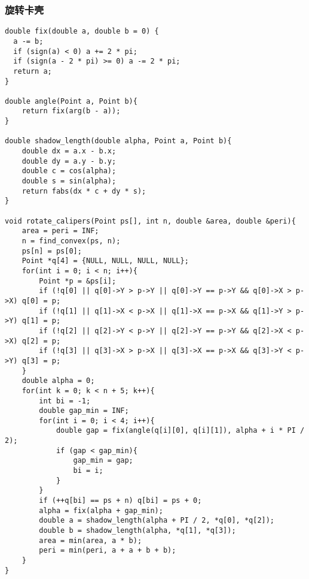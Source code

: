 \subsubsection{旋转卡壳}
\begin{verbatim}
double fix(double a, double b = 0) {
  a -= b;
  if (sign(a) < 0) a += 2 * pi;
  if (sign(a - 2 * pi) >= 0) a -= 2 * pi;
  return a;
}

double angle(Point a, Point b){
    return fix(arg(b - a));
}

double shadow_length(double alpha, Point a, Point b){
    double dx = a.x - b.x;
    double dy = a.y - b.y;
    double c = cos(alpha);
    double s = sin(alpha);
    return fabs(dx * c + dy * s);
}

void rotate_calipers(Point ps[], int n, double &area, double &peri){
    area = peri = INF;
    n = find_convex(ps, n);
    ps[n] = ps[0];
    Point *q[4] = {NULL, NULL, NULL, NULL};
    for(int i = 0; i < n; i++){
        Point *p = &ps[i];
        if (!q[0] || q[0]->Y > p->Y || q[0]->Y == p->Y && q[0]->X > p->X) q[0] = p;
        if (!q[1] || q[1]->X < p->X || q[1]->X == p->X && q[1]->Y > p->Y) q[1] = p;
        if (!q[2] || q[2]->Y < p->Y || q[2]->Y == p->Y && q[2]->X < p->X) q[2] = p;
        if (!q[3] || q[3]->X > p->X || q[3]->X == p->X && q[3]->Y < p->Y) q[3] = p;
    }
    double alpha = 0;
    for(int k = 0; k < n + 5; k++){
        int bi = -1;
        double gap_min = INF;
        for(int i = 0; i < 4; i++){
            double gap = fix(angle(q[i][0], q[i][1]), alpha + i * PI / 2);
            if (gap < gap_min){
                gap_min = gap;
                bi = i;
            }
        }
        if (++q[bi] == ps + n) q[bi] = ps + 0;
        alpha = fix(alpha + gap_min);
        double a = shadow_length(alpha + PI / 2, *q[0], *q[2]);
        double b = shadow_length(alpha, *q[1], *q[3]);
        area = min(area, a * b);
        peri = min(peri, a + a + b + b);
    }
}
\end{verbatim}
